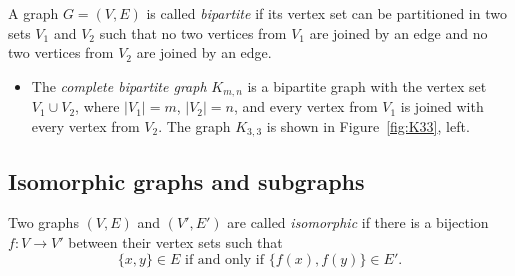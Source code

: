 \begin{page}
\setcounter{section}{1}
\setcounter{subsection}{2}
\setcounter{dfn}{2}
\label{portion:178}

\begin{dfn}
A graph $G = (V, E)$ is called \emph{bipartite} if its vertex set can be partitioned in two sets $V_1$ and $V_2$ such that
no two vertices from $V_1$ are joined by an edge and no two vertices from $V_2$ are joined by an edge.
\end{dfn}

\end{page}

\begin{page}
\setcounter{section}{1}
\setcounter{subsection}{3}
\setcounter{dfn}{2}
\label{portion:179}


\begin{itemize}
\item
The \emph{complete bipartite graph} $K_{m,n}$ is a bipartite graph with the vertex set $V_1 \cup V_2$,
where $|V_1| = m$, $|V_2| = n$, and every vertex from $V_1$ is joined with every vertex from $V_2$.
The graph $K_{3,3}$ is shown in Figure~\ref{fig:K33}, left.
\end{itemize}



\end{page}

\begin{page}
\setcounter{section}{1}
\setcounter{subsection}{3}
\setcounter{dfn}{2}
\label{portion:181}

\subsection{Isomorphic graphs and subgraphs}
\label{sec:Subgraphs}

\end{page}

\begin{page}
\setcounter{section}{1}
\setcounter{subsection}{3}
\setcounter{dfn}{3}
\label{portion:183}

\begin{dfn}
Two graphs $(V, E)$ and $(V', E')$ are called \emph{isomorphic} if there is a bijection $f \colon V \to V'$
between their vertex sets such that
\[
\{x, y\} \in E \text{ if and only if } \{f(x), f(y)\} \in E'.
\]
\end{dfn}

\end{page}


